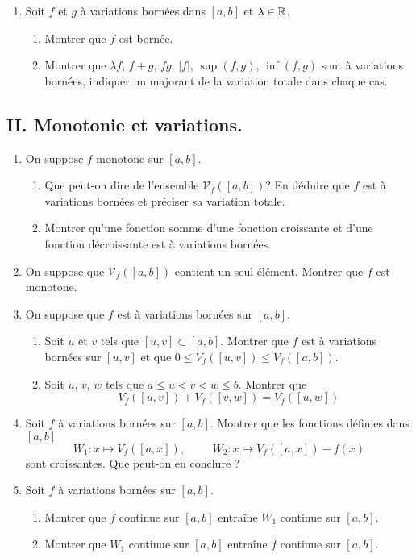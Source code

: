 \begin{enumerate}
\item Soit $f$ et $g$ à variations bornées dans $[a,b]$ et $\lambda\in \mathbb{R}$.
\begin{enumerate}
  \item Montrer que $f$ est bornée.
\item Montrer que $\lambda f$, $f+g$, $fg$, $|f|$, $\sup(f,g)$, $\inf(f,g)$ sont à variations bornées, indiquer un majorant de la variation totale dans chaque cas.
\end{enumerate}

\end{enumerate}


\subsection*{II. Monotonie et variations.}
\begin{enumerate}
  \item On suppose $f$ monotone sur $[a,b]$.
\begin{enumerate}
  \item  Que peut-on dire de l'ensemble $\mathcal{V}_f([a,b])$? En déduire que $f$ est à variations bornées et préciser sa variation totale.
  \item Montrer qu'une fonction somme d'une fonction croissante et d'une fonction décroissante est à variations bornées.
\end{enumerate}
  
  \item On suppose que $\mathcal{V}_f([a,b])$ contient un seul élément. Montrer que $f$ est monotone.
  
  \item On suppose que $f$ est à variations bornées sur $[a,b]$.
\begin{enumerate}
  \item Soit $u$ et $v$ tels que $[u,v] \subset [a,b]$. Montrer que $f$ est à variations bornées sur $[u,v]$ et que $0 \leq V_f([u,v]) \leq V_f([a,b])$.
  \item Soit $u$, $v$, $w$ tels que $a\leq u < v < w \leq b$. Montrer que 
\begin{displaymath}
  V_f([u,v]) + V_f([v,w]) = V_f([u,w])
\end{displaymath}
\end{enumerate}

  \item Soit $f$ à variations bornées sur $[a,b]$. Montrer que les fonctions définies dans $[a,b]$ 
\begin{displaymath}
 W_1: x\mapsto V_f([a,x]),\hspace{1cm} W_2: x\mapsto V_f([a,x]) - f(x)
\end{displaymath}
sont croissantes. Que peut-on en conclure ?  

  \item Soit $f$ à variations bornées sur $[a,b]$.
\begin{enumerate}
  \item Montrer que $f$ continue sur $[a,b]$ entraîne $W_1$ continue sur $[a,b]$.
  \item Montrer que $W_1$ continue sur $[a,b]$ entraîne $f$ continue sur $[a,b]$.
\end{enumerate}

\end{enumerate}


